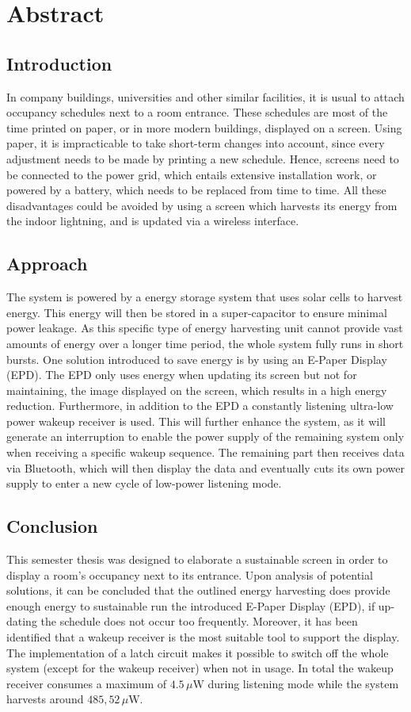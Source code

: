 \chapter*{Abstract}

\section*{Introduction}
In company buildings, universities and other similar facilities, it is usual to attach occupancy schedules next to a room entrance. These schedules are most of the time printed on paper, or in more modern buildings, displayed on a screen. Using paper, it is impracticable to take short-term changes into account, since every adjustment needs to be made by printing a new schedule. Hence, screens need to be connected to the power grid, which entails extensive installation work, or powered by a battery, which needs to be replaced from time to time. All these disadvantages could be avoided by using a screen which harvests its energy from the indoor lightning, and is updated via a wireless interface.



\section*{Approach}
The system is powered by a energy storage system that uses solar cells to harvest energy. This energy will then be stored in a super-capacitor to ensure minimal power leakage. As this specific type of energy harvesting unit cannot provide vast amounts of energy over a longer time period, the whole system fully runs in short bursts. One solution introduced to save energy is by using an E-Paper Display (EPD). The EPD only uses energy when updating its screen but not for maintaining, the image displayed on the screen, which results in a high energy reduction.   Furthermore, in addition to the EPD a constantly listening ultra-low power wakeup receiver is used. This will further enhance the system, as it will generate an interruption to enable the power supply of the remaining system only when receiving a specific wakeup sequence. The remaining part then receives data via Bluetooth, which will then display the data and eventually cuts its own power supply to enter a new cycle of low-power listening mode.

\section*{Conclusion}
This semester thesis was designed to elaborate a sustainable screen in order to display a room’s occupancy next to its entrance. Upon analysis of potential solutions, it can be concluded that the outlined energy harvesting does provide enough energy to sustainable run the introduced E-Paper Display (EPD), if up-dating the schedule does not occur too frequently. Moreover, it has been identified that a wakeup receiver is the most suitable tool to support the display. The implementation of a latch circuit makes it possible to switch off the whole system (except for the wakeup receiver) when not in usage. In total the wakeup receiver consumes a maximum of $4.5\,\mu \text{W}$ during listening mode while the system harvests around $485,52\,\mu\text{W}$. 
